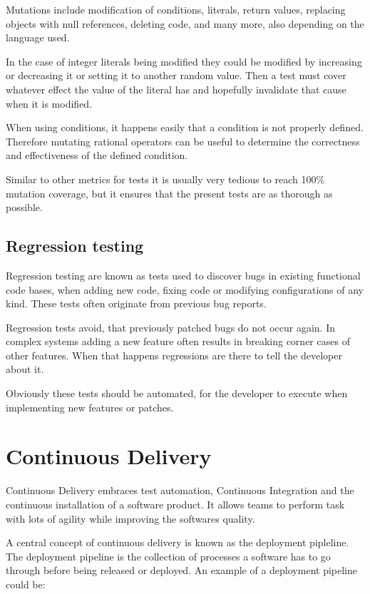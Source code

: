 Mutations include modification of conditions, literals, return values,
replacing objects with null references, deleting code, and many more, also
depending on the language used.

In the case of integer literals being modified they could be modified by
increasing or decreasing it or setting it to another random value. Then a test
must cover whatever effect the value of the literal has and hopefully
invalidate that cause when it is modified.

When using conditions, it happens easily that a condition is not properly
defined. Therefore mutating rational operators can be useful to determine the
correctness and effectiveness of the defined condition.

Similar to other metrics for tests it is usually very tedious to reach 100\%
mutation coverage, but it ensures that the present tests are as thorough as
possible.

\subsection{Regression testing}

Regression testing are known as tests used to discover bugs in existing
functional code bases, when adding new code, fixing code or modifying
configurations of any kind. These tests often originate from previous bug
reports.

Regression tests avoid, that previously patched bugs do not occur again. In
complex systems adding a new feature often results in breaking corner cases of
other features. When that happens regressions are there to tell the developer
about it.

Obviously these tests should be automated, for the developer to execute when
implementing new features or patches.

\section{Continuous Delivery}

Continuous Delivery embraces test automation, Continuous Integration and the
continuous installation of a software product. It allows teams to perform task
with lots of agility while improving the softwares quality.

A central concept of continuous delivery is known as the deployment pipleline.
The deployment pipeline is the collection of processes a software has to go
through before being released or deployed. An example of a deployment pipeline
could be: 

